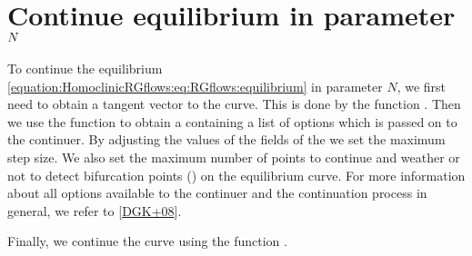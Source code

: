 \documentclass[letterpaper,10pt,english]{jupyterBook}
\begin{document}
\section{Continue equilibrium in parameter \protect\(N\protect\)}
\label{\detokenize{HomoclinicRGflows:continue-equilibrium-in-parameter-n}}
\sphinxAtStartPar
To continue the equilibrium \eqref{equation:HomoclinicRGflows:eq:RGflows:equilibrium} in parameter
\(N\), we first need to obtain a tangent vector to the curve. This is done
by the function . Then we use the function  to obtain a
 containing a list of options which is passed on to the continuer. By
adjusting the values of the fields of the   we set the maximum
step size.  We also set the maximum number of points to continue and weather or
not to detect bifurcation points () on the equilibrium
curve. For more information about all options available to the
 continuer and the continuation process in general, we refer to
{[}\hyperlink{cite.references:id14}{DGK+08}{]}.

\sphinxAtStartPar
Finally, we continue the curve using the function .

\begin{sphinxVerbatim}[commandchars=\\\{\}]
\PYG{p}{[}\PYG{p}{]}
\PYG{p}{[}\PYG{p}{]}
\end{sphinxVerbatim}
\end{document}
